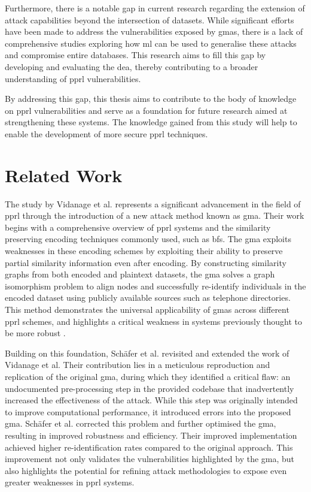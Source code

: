 Furthermore, there is a notable gap in current research regarding the extension of attack capabilities beyond the intersection of datasets.
While significant efforts have been made to address the vulnerabilities exposed by \ac{gma}s, there is a lack of comprehensive studies exploring how \ac{ml} can be used to generalise these attacks and compromise entire databases.
This research aims to fill this gap by developing and evaluating the \ac{dea}, thereby contributing to a broader understanding of \ac{pprl} vulnerabilities.

By addressing this gap, this thesis aims to contribute to the body of knowledge on \ac{pprl} vulnerabilities and serve as a foundation for future research aimed at strengthening these systems.
The knowledge gained from this study will help to enable the development of more secure \ac{pprl} techniques.

\section{Related Work}  \label{sec:rel-work}

The study by Vidanage et al.\cite{vidanage2020graph} represents a significant advancement in the field of \ac{pprl} through the introduction of a new attack method known as \ac{gma}.
Their work begins with a comprehensive overview of \ac{pprl} systems and the similarity preserving encoding techniques commonly used, such as \ac{bf}s.
The \ac{gma} exploits weaknesses in these encoding schemes by exploiting their ability to preserve partial similarity information even after encoding.
By constructing similarity graphs from both encoded and plaintext datasets, the \ac{gma} solves a graph isomorphism problem to align nodes and successfully re-identify individuals in the encoded dataset using publicly available sources such as telephone directories.
This method demonstrates the universal applicability of \ac{gma}s across different \ac{pprl} schemes, and highlights a critical weakness in systems previously thought to be more robust \cite{vidanage2020graph}.

Building on this foundation, Schäfer et al.\cite{schaefer2024} revisited and extended the work of Vidanage et al.
Their contribution lies in a meticulous reproduction and replication of the original \ac{gma}, during which they identified a critical flaw: an undocumented pre-processing step in the provided codebase that inadvertently increased the effectiveness of the attack.
While this step was originally intended to improve computational performance, it introduced errors into the proposed \ac{gma}.
Schäfer et al. corrected this problem and further optimised the \ac{gma}, resulting in improved robustness and efficiency.
Their improved implementation achieved higher re-identification rates compared to the original approach.
This improvement not only validates the vulnerabilities highlighted by the \ac{gma}, but also highlights the potential for refining attack methodologies to expose even greater weaknesses in \ac{pprl} systems.

